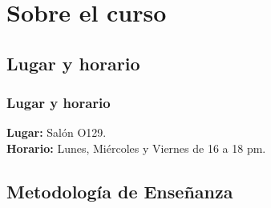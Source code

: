 \documentclass[12pt]{beamer}
\begin{document}
\section{Sobre el curso}
\subsection{Lugar y horario}

\begin{frame}
\frametitle{Lugar y horario} 
\textbf{Lugar: } Salón O129.
\\
\bigskip
\textbf{Horario: } Lunes, Miércoles y Viernes de 16 a 18 pm.
\end{frame}

\subsection{Metodología de Enseñanza}
\end{document}
